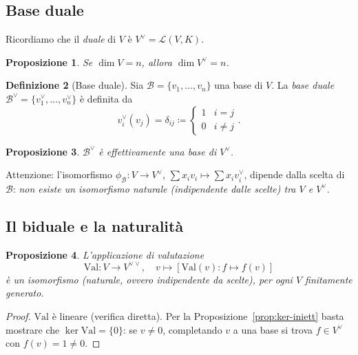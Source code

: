 \documentclass[11pt, a4paper]{book}
\theoremstyle{definition}
\newtheorem{definizione}{Definizione}[section]
\theoremstyle{plain}
\newtheorem{proposizione}[definizione]{Proposizione}
\theoremstyle{remark}
\begin{document}
\subsection{Base duale}

Ricordiamo che il \emph{duale} di $V$ è $V^\vee = \mathcal{L}(V, K)$.

\begin{proposizione}
Se $\dim V = n$, allora $\dim V^\vee = n$.
\end{proposizione}

\begin{defbox}
\begin{definizione}[Base duale]
Sia $\mathcal{B} = \{v_1, \ldots, v_n\}$ una base di $V$. La \emph{base duale} $\mathcal{B}^\vee = \{v_1^\vee, \ldots, v_n^\vee\}$ è definita da
\[
  v_i^\vee(v_j) = \delta_{ij} \coloneqq \begin{cases} 1 & i = j \\ 0 & i \neq j \end{cases}.
\]
\end{definizione}
\end{defbox}

\begin{proposizione}
$\mathcal{B}^\vee$ è effettivamente una base di $V^\vee$.
\end{proposizione}

Attenzione: l'isomorfismo $\phi_\mathcal{B} \colon V \to V^\vee$, $\sum x_i v_i \mapsto \sum x_i v_i^\vee$, dipende dalla scelta di $\mathcal{B}$: \emph{non esiste un isomorfismo naturale (indipendente dalle scelte) tra $V$ e $V^\vee$}.

\subsection{Il biduale e la naturalità}

\begin{proposizione}
L'applicazione di valutazione
\[
  \mathrm{Val} \colon V \to V^{\vee\vee}, \quad v \mapsto [\mathrm{Val}(v) \colon f \mapsto f(v)]
\]
è un isomorfismo (naturale, ovvero indipendente da scelte), per ogni $V$ finitamente generato.
\end{proposizione}

\begin{proof}
$\mathrm{Val}$ è lineare (verifica diretta). Per la Proposizione~\ref{prop:ker-iniett} basta mostrare che $\ker\mathrm{Val} = \{0\}$: se $v \neq 0$, completando $v$ a una base si trova $f \in V^\vee$ con $f(v) = 1 \neq 0$.
\end{proof}
\end{document}
